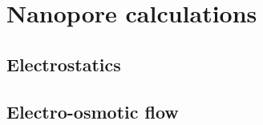 \chapter{Nanopore calculations}
\label{np_calcs}

\section{Electrostatics}

\section{Electro-osmotic flow}